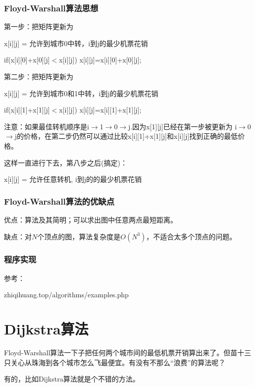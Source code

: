 \documentclass[CJK,14pt]{beamer}
\begin{document}
  \begin{frame}
    \frametitle{Floyd-Warshall算法思想}

    第一步：把矩阵更新为

    x[i][j] = 允许到城市0中转，i到j的最少机票花销

    {\blue \small
  if(x[i][0]+x[0][j]$<$x[i][j]) x[i][j]=x[i][0]+x[0][j];}

\skipline

第二步：把矩阵更新为

x[i][j] = 允许到城市0和1中转，i到j的最少机票花销

{\blue \small
  if(x[i][1]+x[1][j]$<$x[i][j]) x[i][j]=x[i][1]+x[1][j];}
    
{\scriptsize 注意：如果最佳转机顺序是i$\rightarrow$1$\rightarrow$0$\rightarrow$j.因为x[1][j]已经在第一步被更新为 i$\rightarrow$0$\rightarrow$j的价格，在第二步仍然可以通过比较x[i][1]+x[1][j]和x[i][j]找到正确的最低价格。}

这样一直进行下去，第八步之后(搞定)：

x[i][j] = 允许任意转机, i到j的的最少机票花销
  \end{frame}
  
  \begin{frame}
    \frametitle{Floyd-Warshall算法的优缺点}
    \bitem
  \item{优点：算法及其简明；可以求出图中任意两点最短距离。}
  \item{缺点：对$N$个顶点的图，算法复杂度是$O(N^3)$，不适合太多个顶点的问题。}
    \eitem
  \end{frame}

  \begin{frame}
    \frametitle{程序实现}

    参考：
    
    zhiqihuang.top/algorithms/examples.php
    
    
  \end{frame}

  \section{Dijkstra算法}
  
  \begin{frame}
    Floyd-Warshall算法一下子把任何两个城市间的最低机票开销算出来了。但苗十三只关心从珠海到各个城市怎么飞最便宜。有没有不那么“浪费”的算法呢？

    \skiplines
    
    有的，比如Dijkstra算法就是个不错的方法。
  \end{frame}
  
\end{document}

